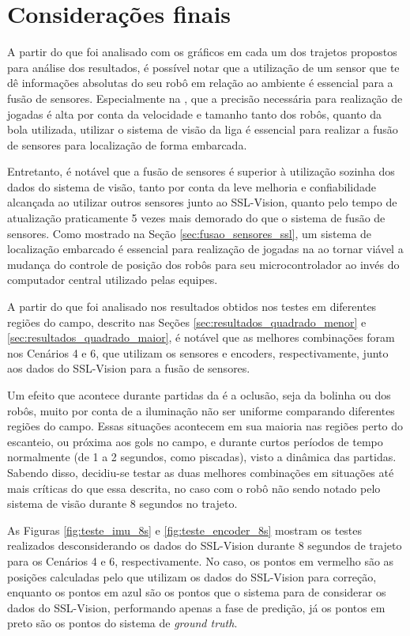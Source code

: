 \documentclass[acronym, symbols, table]{fei}
\begin{document}
	\section{Considerações finais}
	
		A partir do que foi analisado com os gráficos em cada um dos trajetos propostos para análise dos resultados, é possível notar que a utilização de um sensor que te dê informações absolutas do seu robô em relação ao ambiente é essencial para a fusão de sensores. Especialmente na , que a precisão necessária para realização de jogadas é alta por conta da velocidade e tamanho tanto dos robôs, quanto da bola utilizada, utilizar o sistema de visão da liga é essencial para realizar a fusão de sensores para localização de forma embarcada.
		
		Entretanto, é notável que a fusão de sensores é superior à utilização sozinha dos dados do sistema de visão, tanto por conta da leve melhoria e confiabilidade alcançada ao utilizar outros sensores junto ao SSL-Vision, quanto pelo tempo de atualização praticamente 5 vezes mais demorado do que o sistema de fusão de sensores. Como mostrado na Seção \ref{sec:fusao_sensores_ssl}, um sistema de localização embarcado é essencial para realização de jogadas na  ao tornar viável a mudança do controle de posição dos robôs para seu microcontrolador ao invés do computador central utilizado pelas equipes.
		
		A partir do que foi analisado nos resultados obtidos nos testes em diferentes regiões do campo, descrito nas Seções \ref{sec:resultados_quadrado_menor} e \ref{sec:resultados_quadrado_maior}, é notável que as melhores combinações foram nos Cenários 4 e 6, que utilizam os sensores  e encoders, respectivamente, junto aos dados do SSL-Vision para a fusão de sensores.
		
		Um efeito que acontece durante partidas da  é a oclusão, seja da bolinha ou dos robôs, muito por conta de a iluminação não ser uniforme comparando diferentes regiões do campo. Essas situações acontecem em sua maioria nas regiões perto do escanteio, ou próxima aos gols no campo, e durante curtos períodos de tempo normalmente (de 1 a 2 segundos, como piscadas), visto a dinâmica das partidas. Sabendo disso, decidiu-se testar as duas melhores combinações em situações até mais críticas do que essa descrita, no caso com o robô não sendo notado pelo sistema de visão durante 8 segundos no trajeto.
		
		As Figuras \ref{fig:teste_imu_8s} e \ref{fig:teste_encoder_8s} mostram os testes realizados desconsiderando os dados do SSL-Vision durante 8 segundos de trajeto para os Cenários 4 e 6, respectivamente. No caso, os pontos em vermelho são as posições calculadas pelo  que utilizam os dados do SSL-Vision para correção, enquanto os pontos em azul são os pontos que o sistema para de considerar os dados do SSL-Vision, performando apenas a fase de predição, já os pontos em preto são os pontos do sistema de \textit{ground truth}.
		
\end{document}
